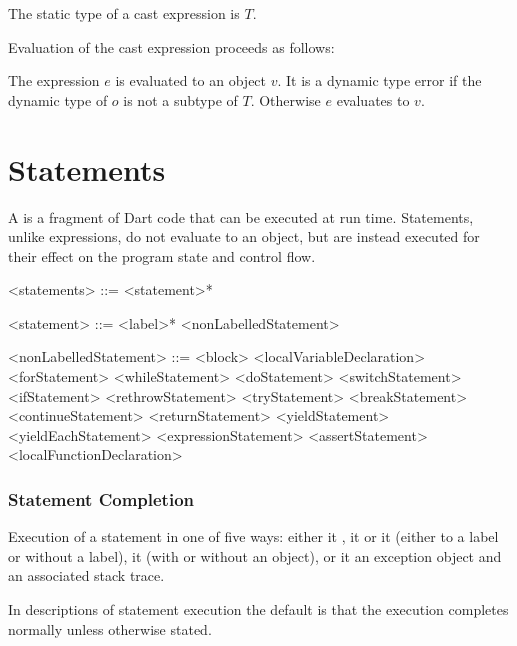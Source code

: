 \documentclass[makeidx]{article}
\begin{document}
\LMHash{}%
The static type of a cast expression  is $T$.

\LMHash{}%
Evaluation of the cast expression  proceeds as follows:

\LMHash{}%
The expression $e$ is evaluated to an object $v$.
It is a dynamic type error if the dynamic type of $o$ is not a subtype of $T$.
Otherwise $e$ evaluates to $v$.


\section{Statements}

\LMHash{}%
A  is a fragment of Dart code that can be executed at run time.
Statements, unlike expressions, do not evaluate to an object,
but are instead executed for their effect on the program state and control flow.

\begin{grammar}
<statements> ::= <statement>*

<statement> ::= <label>* <nonLabelledStatement>

<nonLabelledStatement> ::= <block>
  \alt <localVariableDeclaration>
  \alt <forStatement>
  \alt <whileStatement>
  \alt <doStatement>
  \alt <switchStatement>
  \alt <ifStatement>
  \alt <rethrowStatement>
  \alt <tryStatement>
  \alt <breakStatement>
  \alt <continueStatement>
  \alt <returnStatement>
  \alt <yieldStatement>
  \alt <yieldEachStatement>
  \alt <expressionStatement>
  \alt <assertStatement>
  \alt <localFunctionDeclaration>
\end{grammar}


\subsubsection{Statement Completion}

\LMHash{}%
Execution of a statement 
in one of five ways:
either it
,
it 
or it 
(either to a label or without a label),
it  (with or without an object),
or it 
an exception object and an associated stack trace.

\LMHash{}%
In descriptions of statement execution the default is that
the execution completes normally unless otherwise stated.
\end{document}
